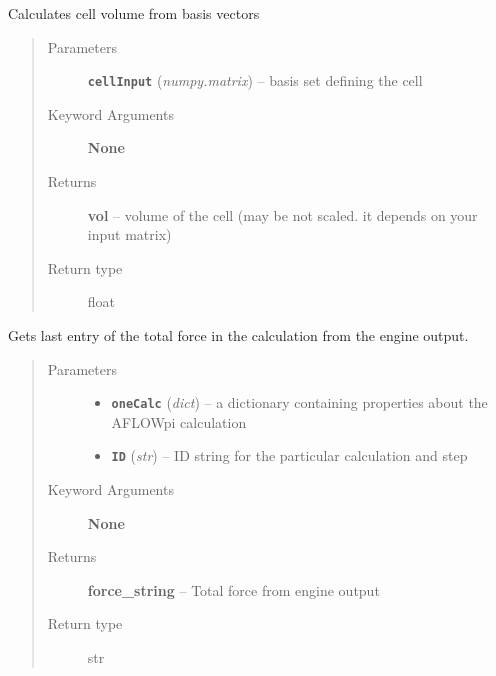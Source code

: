 \documentclass[letterpaper,10pt,english]{sphinxmanual}
\begin{document}
\begin{fulllineitems}
\label{retr:retr.getCellVolumeFromVectors}
Calculates cell volume from basis vectors
\begin{quote}\begin{description}
\item[{Parameters}] \leavevmode
\textbf{\texttt{cellInput}} (\emph{numpy.matrix}) -- basis set defining the cell

\item[{Keyword Arguments}] \leavevmode
\textbf{None}

\item[{Returns}] \leavevmode
\textbf{vol} --
volume of the cell (may be not scaled. it depends on your input matrix)

\item[{Return type}] \leavevmode
float

\end{description}\end{quote}

\end{fulllineitems}


\begin{fulllineitems}
\label{retr:retr.getForce}
Gets last entry of the total force in the calculation from the engine output.
\begin{quote}\begin{description}
\item[{Parameters}] \leavevmode\begin{itemize}
\item {} 
\textbf{\texttt{oneCalc}} (\emph{dict}) -- a dictionary containing properties about the AFLOWpi calculation

\item {} 
\textbf{\texttt{ID}} (\emph{str}) -- ID string for the particular calculation and step

\end{itemize}

\item[{Keyword Arguments}] \leavevmode
\textbf{None}

\item[{Returns}] \leavevmode
\textbf{force\_string} --
Total force from engine output

\item[{Return type}] \leavevmode
str

\end{description}\end{quote}

\end{fulllineitems}
\end{document}
